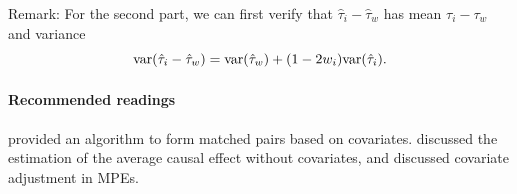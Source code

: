 Remark: For the second part, we can first verify that $\hat\tau_i -\hat\tau_w$ has mean $\tau_i - \tau_w$ and variance
 $$
 \textup{var}(\hat\tau_i -\hat\tau_w) = \textup{var}(\hat\tau_w ) + (1-2w_i) \textup{var}(\hat\tau_i). 
 $$


\paragraph{Recommended readings}

\citet{greevy2004optimal} provided an algorithm to form matched pairs based on covariates. 
\citet{imai2008variance} discussed the estimation of the average causal effect without covariates,
and 
\citet{fogarty2018regression} discussed covariate adjustment in MPEs. 


